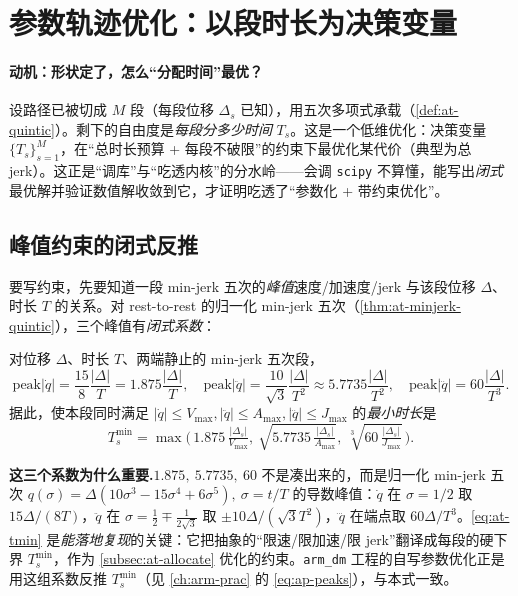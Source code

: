 \section{参数轨迹优化：以段时长为决策变量}
\label{sec:at-paramopt}

\paragraph{动机：形状定了，怎么“分配时间”最优？}
设路径已被切成 $M$ 段（每段位移 $\Delta_s$ 已知），用五次多项式承载（\cref{def:at-quintic}）。剩下的自由度是\emph{每段分多少时间} $T_s$。这是一个低维优化：决策变量 $\{T_s\}_{s=1}^{M}$，在“总时长预算 + 每段不破限”的约束下最优化某代价（典型为总 jerk）。这正是“调库”与“吃透内核”的分水岭——会调 \texttt{scipy} 不算懂，能写出\emph{闭式}最优解并验证数值解收敛到它，才证明吃透了“参数化 + 带约束优化”。

\subsection{峰值约束的闭式反推}
\label{subsec:at-peaks}

要写约束，先要知道一段 min-jerk 五次的\emph{峰值}速度/加速度/jerk 与该段位移 $\Delta$、时长 $T$ 的关系。对 rest-to-rest 的归一化 min-jerk 五次（\cref{thm:at-minjerk-quintic}），三个峰值有\emph{闭式系数}：

\begin{proposition}\label{prop:at-peaks}
对位移 $\Delta$、时长 $T$、两端静止的 min-jerk 五次段，
\begin{equation}
  \mathrm{peak}|\dot q|=\frac{15}{8}\frac{|\Delta|}{T}=1.875\frac{|\Delta|}{T},\quad
  \mathrm{peak}|\ddot q|=\frac{10}{\sqrt 3}\frac{|\Delta|}{T^2}\approx 5.7735\frac{|\Delta|}{T^2},\quad
  \mathrm{peak}|\dddot q|=60\frac{|\Delta|}{T^3}.
  \label{eq:at-peaks}
\end{equation}
据此，使本段同时满足 $|\dot q|\le V_{\max},|\ddot q|\le A_{\max},|\dddot q|\le J_{\max}$ 的\emph{最小时长}是
\begin{equation}
  T_s^{\min}=\max\!\Big(\,1.875\,\tfrac{|\Delta_s|}{V_{\max}},\ \sqrt{5.7735\,\tfrac{|\Delta_s|}{A_{\max}}},\ \sqrt[3]{60\,\tfrac{|\Delta_s|}{J_{\max}}}\,\Big).
  \label{eq:at-tmin}
\end{equation}
\end{proposition}

\begin{note}
\textbf{这三个系数为什么重要.}\;$1.875,\ 5.7735,\ 60$ 不是凑出来的，而是归一化 min-jerk 五次 $q(\sigma)=\Delta(10\sigma^3-15\sigma^4+6\sigma^5),\ \sigma=t/T$ 的导数峰值：$\dot q$ 在 $\sigma=1/2$ 取 $15\Delta/(8T)$，$\ddot q$ 在 $\sigma=\tfrac12\mp\tfrac{1}{2\sqrt3}$ 取 $\pm 10\Delta/(\sqrt3 T^2)$，$\dddot q$ 在端点取 $60\Delta/T^3$。\cref{eq:at-tmin} 是\emph{能落地复现}的关键：它把抽象的“限速/限加速/限 jerk”翻译成每段的硬下界 $T_s^{\min}$，作为 \cref{subsec:at-allocate} 优化的约束。\texttt{arm\_dm} 工程的自写参数优化正是用这组系数反推 $T_s^{\min}$（见 \cref{ch:arm-prac} 的 \cref{eq:ap-peaks}），与本式一致。
\end{note}

